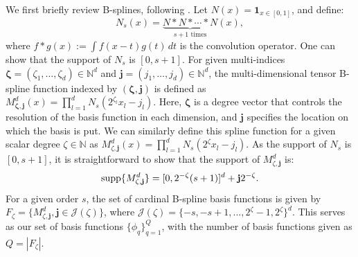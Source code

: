 \documentclass[aos,preprint]{imsart}
\theoremstyle{plain}
\theoremstyle{remark}
\begin{document}
We first briefly review B-splines, following \cite{hollig2003finite}. Let $ N(x) = \boldsymbol{1}_{x \in [0,1]}$, and define:
\begin{equation}
    \label{eq:B_spline}
    N_s(x) = \underbrace{N \ast N \ast \cdots \ast N}_{ \text{$s+1$ times}}(x),
\end{equation}
where \( f \ast g(x) := \int f(x - t)g(t) \, dt \) is the convolution operator. One can show that the support of $N_s$ is $[0,s+1]$. For given multi-indices \( \boldsymbol{\zeta} = (\zeta_1, \ldots, \zeta_d) \in \mathbb{N}^d \) and \( \mathbf{j} = (j_1, \ldots, j_d) \in \mathbb{N}^d \), the multi-dimensional tensor B-spline function indexed by $(\boldsymbol{\zeta}, \mathbf{j})$ is defined as 
$M_{\boldsymbol{\zeta}, \mathbf{j}}^d(x) = \prod_{l=1}^d N_s(2^{\zeta_l}x_l - j_l)$.
Here, \( \boldsymbol{\zeta} \) is a degree vector that controls the resolution of the basis function in each dimension, and \( \mathbf{j} \) specifies the location on which the basis is put. We can similarly define this spline function for a given scalar degree $\zeta \in \mathbb{N}$ as $M_{\zeta, \mathbf{j}}^d(x) = \prod_{l=1}^d N_s(2^\zeta x_l - j_l)$. As the support of $N_s$ is $[0,s+1]$, it is straightforward to show that the support of $M_{\zeta, \mathbf{j}}^d$ is:
\begin{equation}
    \label{eq:B_spline_support}
    {\rm supp}\{M_{\zeta, \mathbf{j}}^d\}=[0,2^{-\zeta}(s+1)]^d+\bold{j}2^{-\zeta}.
\end{equation}
 For a given order $s$, the set of cardinal B-spline basis functions is given by $F_\zeta=\{M_{\zeta, \mathbf{j}}^d, \mathbf{j}\in \mathcal{J}(\zeta)\}$, where $\mathcal{J}(\zeta)=\{-s,-s+1,...,2^\zeta-1,2^\zeta\}^d$. This serves as our set of basis functions $\{\phi_q\}_{q=1}^Q$, with the number of basis functions given as $Q= | F_{\zeta}|$. 


\end{document}
